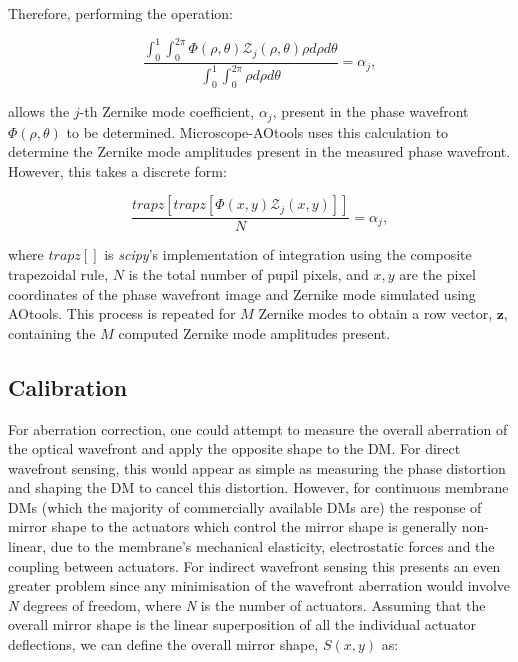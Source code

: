 Therefore, performing the operation:

\begin{equation}\label{eq:zernike_amp_extraction}
\frac{\int_{0}^{1}\int_{0}^{2\pi}\Phi\left(\rho,\theta\right)\mathcal{Z}_{j}\left(\rho,\theta\right)\rho d\rho d\theta}{\int_{0}^{1}\int_{0}^{2\pi}\rho d\rho d\theta} = \alpha_{j},
\end{equation}

allows the $j$-th Zernike mode coefficient, $\alpha_{j}$, present in the 
phase wavefront $\Phi\left(\rho,\theta\right)$ to be determined. 
Microscope-AOtools uses this calculation to determine the Zernike mode 
amplitudes present in the measured phase wavefront. However, this takes a 
discrete form:

\begin{equation}\label{eq:zernike_amp_extraction_discrete}
\frac{trapz\left[trapz\left[\Phi\left(x,y\right)\mathcal{Z}_{j}\left(x,y\right)\right]\right]}{N} = \alpha_{j},
\end{equation}

where $trapz[]$ is \textit{scipy}'s implementation of integration using the 
composite trapezoidal rule, $N$ is the total number of pupil pixels, and 
$x,y$ are the pixel coordinates of the phase wavefront image and Zernike mode 
simulated using AOtools\cite{virtanen2020scipy,townson2019aotools}. This 
process is repeated for $M$ Zernike modes to obtain a row vector, 
$\boldsymbol{z}$, containing the $M$ computed Zernike mode amplitudes present.

\subsection{Calibration}
\label{subsec:calibration}

For aberration correction, one could attempt to measure the overall aberration of the optical wavefront and apply the opposite shape to the DM. For direct wavefront sensing, this would appear as simple as measuring the phase distortion and shaping the DM to cancel this distortion. However, for continuous membrane DMs (which the majority of commercially available DMs are) the response of mirror shape to the actuators which control the mirror shape is generally non-linear, due to the membrane's mechanical elasticity, electrostatic forces and the coupling between actuators\cite{Zhu:99}. For indirect wavefront sensing this presents an even greater problem since any minimisation of the wavefront aberration would involve \textit{N} degrees of freedom, where \textit{N} is the number of actuators. Assuming that the overall mirror shape is the linear 
superposition of all the individual actuator deflections, we can 
define the overall mirror shape, $S(x,y)$ as:

